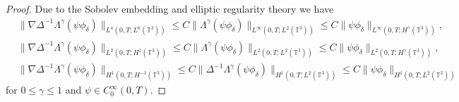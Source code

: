 \documentclass[10pt,a4paper]{amsart}
\begin{document}
\begin{proof}
				Due to the Sobolev embedding and elliptic regularity theory  we have
				\begin{align*}
					&\|\nabla\Delta^{-1}\Lambda^{\gamma}(\psi\phi_{\delta})\|_{L^4(0,T;L^{6}(\mathbb{T}^3))} \leq
					C\|\Lambda^{\gamma}(\psi\phi_{\delta})\|_{L^{\infty}(0,T;L^{2}(\mathbb{T}^{3}))}
					\leq C\|\psi\phi_{\delta}\|_{L^{\infty}(0,T;H^{\gamma}(\mathbb{T}^{3}))},
					\\&
					\|\nabla\Delta^{-1}\Lambda^{\gamma}(\psi\phi_{\delta})\|_{L^{2}(0,T;H^{1}(\mathbb{T}^{3}))} \leq
					C\|\Lambda^{\gamma}(\psi\phi_{\delta})\|_{L^{2}(0,T;L^{2}(\mathbb{T}^{3}))}
					\leq C\|\psi\phi_{\delta}\|_{L^{2}(0,T;H^{\gamma}(\mathbb{T}^{3}))},
					\\&
					\|\nabla\Delta^{-1}\Lambda^{\gamma}(\psi\phi_{\delta})\|_{H^{1}(0,T;H^{-1}(\mathbb{T}^{3}))}\leq
					C\|\Delta^{-1}\Lambda^{\gamma}(\psi\phi_{\delta})\|_{H^{1}(0,T;L^{2}(\mathbb{T}^{3}))}
					\leq C\|\psi\phi_{\delta}\|_{H^{1}(0,T;L^{2}(\mathbb{T}^{3}))}
				\end{align*}
				for $0\leq\gamma\leq1$ and $\psi\in C_{0}^{\infty}(0,T)$.

\end{proof}
\end{document}
